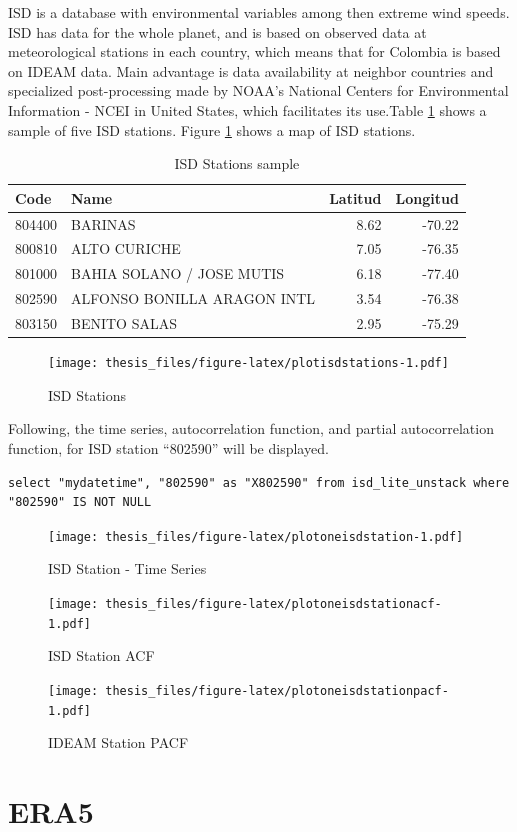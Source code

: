 \documentclass[12pt,oneside]{reedthesis}
\begin{document}
ISD is a database with environmental variables among then extreme wind speeds. ISD has data for the whole planet, and is based on observed data at meteorological stations in each country, which means that for Colombia is based on IDEAM data. Main advantage is data availability at neighbor countries and specialized post-processing made by NOAA's National Centers for Environmental Information - NCEI in United States, which facilitates its use.Table \ref{tab:tableisdstations} shows a sample of five ISD stations. Figure \ref{fig:plotisdstations} shows a map of ISD stations.
\begin{longtable}[t]{llrr}
\caption[ISD Stations]{\label{tab:tableisdstations}ISD Stations sample}\\
\toprule
Code & Name & Latitud & Longitud\\
\midrule
804400 & BARINAS & 8.62 & -70.22\\
800810 & ALTO CURICHE & 7.05 & -76.35\\
801000 & BAHIA SOLANO / JOSE MUTIS & 6.18 & -77.40\\
802590 & ALFONSO BONILLA ARAGON INTL & 3.54 & -76.38\\
803150 & BENITO SALAS & 2.95 & -75.29\\
\bottomrule
\end{longtable}
\begin{figure}
\centering
\texttt{[image: thesis\_files/figure-latex/plotisdstations-1.pdf]}
\caption{\label{fig:plotisdstations}ISD Stations}
\end{figure}
Following, the time series, autocorrelation function, and partial autocorrelation function, for ISD station ``802590'' will be displayed.
\begin{verbatim}
select "mydatetime", "802590" as "X802590" from isd_lite_unstack where "802590" IS NOT NULL
\end{verbatim}
\begin{figure}
\centering
\texttt{[image: thesis\_files/figure-latex/plotoneisdstation-1.pdf]}
\caption{\label{fig:plotoneisdstation}ISD Station - Time Series}
\end{figure}
\begin{figure}
\centering
\texttt{[image: thesis\_files/figure-latex/plotoneisdstationacf-1.pdf]}
\caption{\label{fig:plotoneisdstationacf}ISD Station ACF}
\end{figure}
\begin{figure}
\centering
\texttt{[image: thesis\_files/figure-latex/plotoneisdstationpacf-1.pdf]}
\caption{\label{fig:plotoneisdstationpacf}IDEAM Station PACF}
\end{figure}
\hypertarget{era5}{%
\section{ERA5}\label{era5}}
\end{document}
